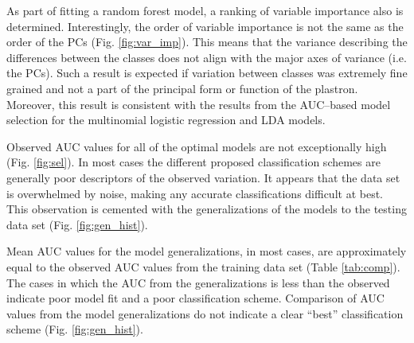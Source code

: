 \documentclass[12pt,letterpaper]{article}
\begin{document}
As part of fitting a random forest model, a ranking of variable importance also is determined. Interestingly, the order of variable importance is not the same as the order of the PCs (Fig. \ref{fig:var_imp}). This means that the variance describing the differences between the classes does not align with the major axes of variance (i.e. the PCs). Such a result is expected if variation between classes was extremely fine grained and not a part of the principal form or function of the plastron. Moreover, this result is consistent with the results from the AUC--based model selection for the multinomial logistic regression and LDA models.

Observed AUC values for all of the optimal models are not exceptionally high (Fig. \ref{fig:sel}). In most cases the different proposed classification schemes are generally poor descriptors of the observed variation. It appears that the data set is overwhelmed by noise, making any accurate classifications difficult at best. This observation is cemented with the generalizations of the models to the testing data set (Fig. \ref{fig:gen_hist}).

Mean AUC values for the model generalizations, in most cases, are approximately equal to the observed AUC values from the training data set (Table \ref{tab:comp}). The  cases in which the AUC from the  generalizations is less than the observed indicate poor model fit and a poor classification scheme. Comparison of AUC values from the model generalizations do not indicate a clear ``best'' classification scheme (Fig. \ref{fig:gen_hist}). 
\end{document}
